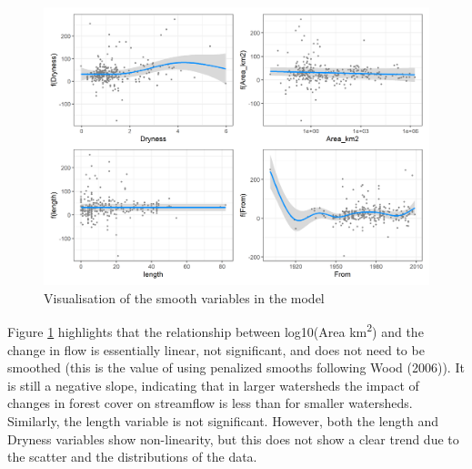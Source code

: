 \documentclass[]{elsarticle} %
\begin{document}
\begin{figure}
\includegraphics[width=0.9\linewidth]{model6_smooths} \caption{Visualisation of the smooth variables in the model}\label{fig:smoothsmodel6}
\end{figure}

Figure \ref{fig:smoothsmodel6} highlights that the relationship between log10(Area km\textsuperscript{2}) and the change in flow is essentially linear, not significant, and does not need to be smoothed (this is the value of using penalized smooths following Wood (2006)). It is still a negative slope, indicating that in larger watersheds the impact of changes in forest cover on streamflow is less than for smaller watersheds. Similarly, the length variable is not significant. However, both the length and Dryness variables show non-linearity, but this does not show a clear trend due to the scatter and the distributions of the data.
\end{document}
